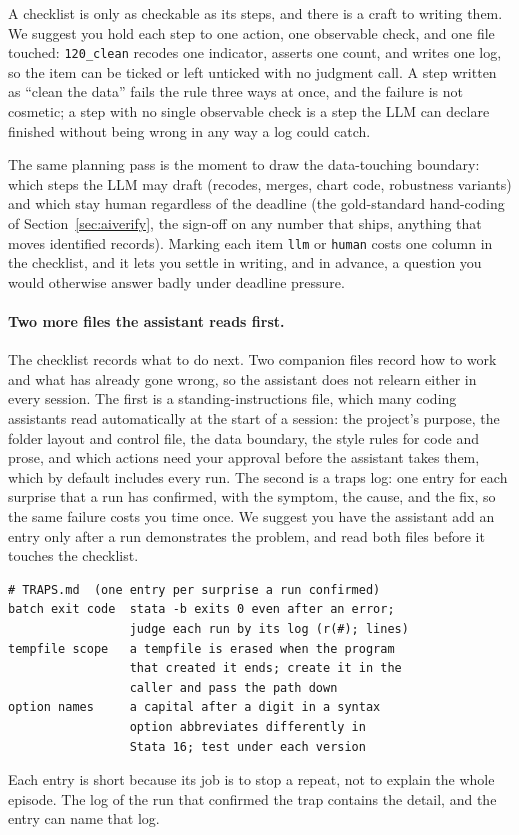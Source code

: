 A checklist is only as checkable as its steps, and there is a craft to writing them. We suggest you hold each step to one action, one observable check, and one file touched: \texttt{120\_clean} recodes one indicator, asserts one count, and writes one log, so the item can be ticked or left unticked with no judgment call. A step written as \enquote{clean the data} fails the rule three ways at once, and the failure is not cosmetic; a step with no single observable check is a step the LLM can declare finished without being wrong in any way a log could catch.

The same planning pass is the moment to draw the data-touching boundary: which steps the LLM may draft (recodes, merges, chart code, robustness variants) and which stay human regardless of the deadline (the gold-standard hand-coding of Section~\ref{sec:aiverify}, the sign-off on any number that ships, anything that moves identified records). Marking each item \texttt{llm} or \texttt{human} costs one column in the checklist, and it lets you settle in writing, and in advance, a question you would otherwise answer badly under deadline pressure.

\paragraph{Two more files the assistant reads first.} The checklist records what to do next. Two companion files record how to work and what has already gone wrong, so the assistant does not relearn either in every session. The first is a standing-instructions file, which many coding assistants read automatically at the start of a session: the project's purpose, the folder layout and control file, the data boundary, the style rules for code and prose, and which actions need your approval before the assistant takes them, which by default includes every run. The second is a traps log: one entry for each surprise that a run has confirmed, with the symptom, the cause, and the fix, so the same failure costs you time once. We suggest you have the assistant add an entry only after a run demonstrates the problem, and read both files before it touches the checklist.
\par
{\footnotesize
\begin{verbatim}
# TRAPS.md  (one entry per surprise a run confirmed)
batch exit code  stata -b exits 0 even after an error;
                 judge each run by its log (r(#); lines)
tempfile scope   a tempfile is erased when the program
                 that created it ends; create it in the
                 caller and pass the path down
option names     a capital after a digit in a syntax
                 option abbreviates differently in
                 Stata 16; test under each version
\end{verbatim}
}
Each entry is short because its job is to stop a repeat, not to explain the whole episode. The log of the run that confirmed the trap contains the detail, and the entry can name that log.

